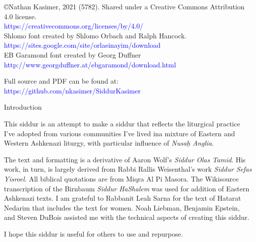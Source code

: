 \author{מסודר ע״י
\\
\textbf{ﭏיעזר בן זאב וואלף קזימיר}}
\date{נוסח אשכנז}

\maketitle

\begin{minipage}[b][\textheight][b]{\textwidth}
\begin{english}
\raggedright
\vfill
©Nathan Kasimer, 2021 (5782). Shared under a Creative Commons Attribution 4.0 license.\\
\textcolor{blue}{https://creativecommons.org/licenses/by/4.0/}\\

Shlomo font created by Shlomo Orbach and Ralph Hancock.\\ \textcolor{blue}{https://sites.google.com/site/orlaeinayim/download}\\EB Garamond font created by Georg Duffner\\\textcolor{blue}{http://www.georgduffner.at/ebgaramond/download.html}

Full \XeLaTeX \quad source and PDF can be found at:\\ \textcolor{blue}{https://github.com/nkasimer/Siddur\textunderscore Kasimer}


\end{english}
\end{minipage}
\clearpage
\begin{minipage}{\textwidth}

\begin{english}
\begin{center} %
\begin{LARGE}
Introduction
\end{LARGE}
\end{center}

This siddur is an attempt to make a siddur that reflects the liturgical practice I've adopted from various communities I've lived in\textemdash a mixture of Eastern and Western Ashkenazi liturgy, with particular influence of \textit{Nusa\d{h} Anglia}.

The text and formatting is a derivative of Aaron Wolf's \textit{Siddur Olas Tamid}.  His work, in turn, is largely derived from Rabbi Rallis Weisenthal's work \textit{Siddur Sefas Yisroel}. All biblical quotations are from Miqra Al Pi Masora. The Wikisource transcription of the Birnbaum \textit{Siddur HaShalem} was used for addition of Eastern Ashkenazi texts. I am grateful to Rabbanit Leah Sarna for the text of Hatarat Nedarim that includes the text for women.  Noah Liebman, Benjamin Epstein, and Steven DuBois assisted me with the technical aspects of creating this siddur.

I hope this siddur is useful for others to use and repurpose.

\end{english}

\end{minipage}

